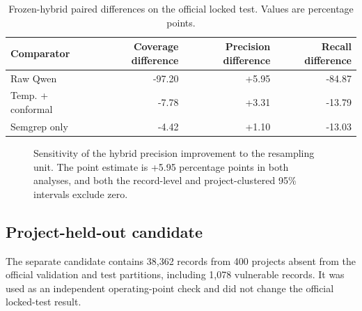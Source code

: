 \documentclass[pdflatex,sn-mathphys-num]{sn-jnl}
\begin{document}
\begin{table}[htbp]
\caption{Frozen-hybrid paired differences on the official locked test. Values are percentage points.}\label{tab:paired}
\centering
{\small
\begin{tabular}{@{}lrrr@{}}
\toprule
Comparator & Coverage difference & Precision difference & Recall difference\\
\midrule
Raw Qwen & -97.20 & +5.95 & -84.87\\
Temp. + conformal & -7.78 & +3.31 & -13.79\\
Semgrep only & -4.42 & +1.10 & -13.03\\
\bottomrule
\end{tabular}}
\end{table}

\begin{figure}[htbp]
\centering
{}
\caption{Sensitivity of the hybrid precision improvement to the resampling unit. The point estimate is +5.95 percentage points in both analyses, and both the record-level and project-clustered 95\% intervals exclude zero.}
\label{fig:precision-robustness}
\end{figure}

\subsection{Project-held-out candidate}

The separate candidate contains 38,362 records from 400 projects absent from the official validation and test partitions, including 1,078 vulnerable records. It was used as an independent operating-point check and did not change the official locked-test result.
\end{document}
